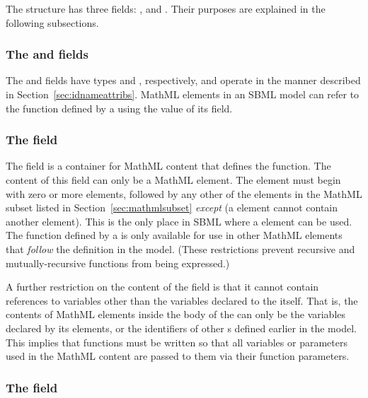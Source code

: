 The \FunctionDefinition structure has three fields: ,
 and .  Their purposes are explained in
the following subsections.


\subsubsection{The  and  fields}

The  and  fields have types 
and , respectively, and operate in the manner
described in Section~\ref{sec:idnameattribs}.  MathML 
elements in an SBML model can refer to the function defined by a
\FunctionDefinition using the value of its  field.


\subsubsection{The  field}
\label{sec:function-definition-math}

The  field is a container for MathML content that
defines the function.  The content of this field can only be a
MathML  element.  The  element must
begin with zero or more  elements, followed by any
other of the elements in the MathML subset listed in
Section~\ref{sec:mathmlsubset} \emph{except}  (\ie a
 element cannot contain another 
element).  This is the only place in SBML where a 
element can be used.  The function defined by a
\FunctionDefinition is only available for use in other MathML
elements that \emph{follow} the \FunctionDefinition definition in
the model.  (These restrictions prevent recursive and
mutually-recursive functions from being expressed.)

A further restriction on the content of the  field is
that it cannot contain references to variables other than the
variables declared to the  itself.  That is, the
contents of MathML  elements inside the body of the
 can only be the variables declared by its
 elements, or the identifiers of other
\FunctionDefinition{}s defined earlier in the model.  This implies
that functions must be written so that all variables or parameters
used in the MathML content are passed to them via their function
parameters.


\subsubsection{The  field}
\label{sec:functiondefinition-sboterm}

